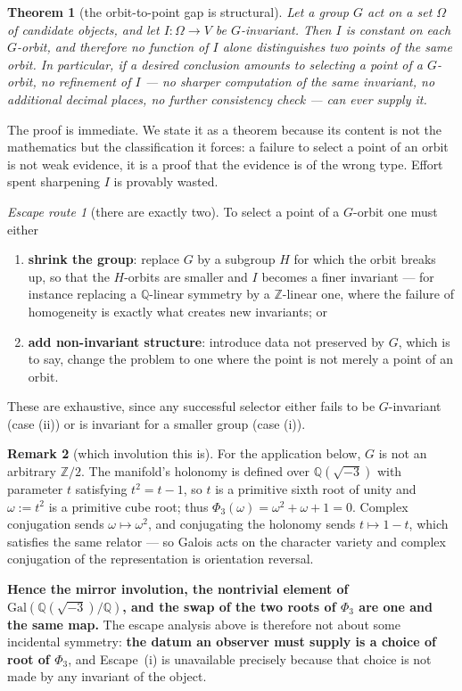 \documentclass[11pt,a4paper]{article}
\newtheorem{theorem}{Theorem}[section]
\theoremstyle{definition}
\newtheorem{remark}[theorem]{Remark}
\theoremstyle{remark}
\newtheorem{escape}{Escape route}
\newcommand{\Z}{\mathbb{Z}}
\newcommand{\Q}{\mathbb{Q}}
\begin{document}
\begin{theorem}[the orbit-to-point gap is structural]\label{thm:orbit}
Let a group $G$ act on a set $\Omega$ of candidate objects, and let $I:\Omega\to V$ be
$G$-invariant. Then $I$ is constant on each $G$-orbit, and therefore no function of $I$ alone
distinguishes two points of the same orbit. In particular, if a desired conclusion amounts to
selecting a point of a $G$-orbit, no refinement of $I$ --- no sharper computation of the same
invariant, no additional decimal places, no further consistency check --- can ever supply it.
\end{theorem}

The proof is immediate. We state it as a theorem because its content is not the mathematics but
the classification it forces: a failure to select a point of an orbit is not weak evidence, it is
a proof that the evidence is of the wrong type. Effort spent sharpening $I$ is provably wasted.

\begin{escape}[there are exactly two]\label{esc:orbit}
To select a point of a $G$-orbit one must either
\begin{enumerate}[label=\textup{(\roman*)},leftmargin=2.4em]
\item \textbf{shrink the group}: replace $G$ by a subgroup $H$ for which the orbit breaks up, so
      that the $H$-orbits are smaller and $I$ becomes a finer invariant --- for instance replacing
      a $\Q$-linear symmetry by a $\Z$-linear one, where the failure of homogeneity is exactly what
      creates new invariants; or
\item \textbf{add non-invariant structure}: introduce data not preserved by $G$, which is to say,
      change the problem to one where the point is not merely a point of an orbit.
\end{enumerate}
These are exhaustive, since any successful selector either fails to be $G$-invariant (case (ii))
or is invariant for a smaller group (case (i)).
\end{escape}

\begin{remark}[which involution this is]\label{rem:whichinvolution}
For the application below, $G$ is not an arbitrary $\Z/2$. The manifold's holonomy is defined over
$\Q(\sqrt{-3})$ with parameter $t$ satisfying $t^2=t-1$, so $t$ is a primitive sixth root of unity
and $\omega:=t^2$ is a primitive cube root; thus $\Phi_3(\omega)=\omega^2+\omega+1=0$. Complex
conjugation sends $\omega\mapsto\omega^2$, and conjugating the holonomy sends $t\mapsto1-t$, which
satisfies the same relator --- so Galois acts on the character variety and complex conjugation of
the representation is orientation reversal.

\textbf{Hence the mirror involution, the nontrivial element of $\mathrm{Gal}(\Q(\sqrt{-3})/\Q)$, and
the swap of the two roots of $\Phi_3$ are one and the same map.} The escape analysis above is
therefore not about some incidental symmetry: \textbf{the datum an observer must supply is a choice
of root of $\Phi_3$}, and Escape~(i) is unavailable precisely because that choice is not made by any
invariant of the object.
\end{remark}
\end{document}
